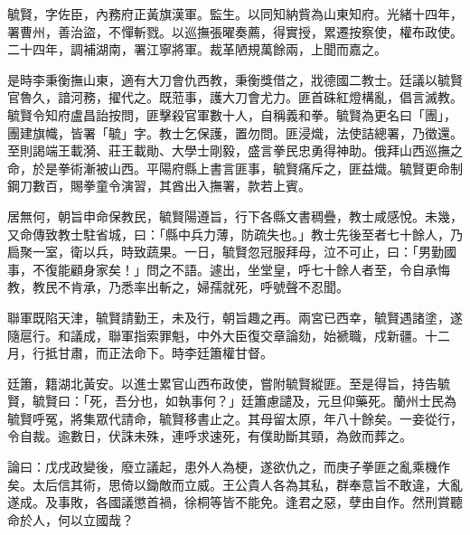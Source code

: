 \begin{pinyinscope}
毓賢，字佐臣，內務府正黃旗漢軍。監生。以同知納貲為山東知府。光緒十四年，署曹州，善治盜，不憚斬戮。以巡撫張曜奏薦，得實授，累遷按察使，權布政使。二十四年，調補湖南，署江寧將軍。裁革陋規萬餘兩，上聞而嘉之。

是時李秉衡撫山東，適有大刀會仇西教，秉衡獎借之，戕德國二教士。廷議以毓賢官魯久，諳河務，擢代之。既蒞事，護大刀會尤力。匪首硃紅燈構亂，倡言滅教。毓賢令知府盧昌詒按問，匪擊殺官軍數十人，自稱義和拳。毓賢為更名曰「團」，團建旗幟，皆署「毓」字。教士乞保護，置勿問。匪浸熾，法使詰總署，乃徵還。至則謁端王載漪、莊王載勛、大學士剛毅，盛言拳民忠勇得神助。俄拜山西巡撫之命，於是拳術漸被山西。平陽府縣上書言匪事，毓賢痛斥之，匪益熾。毓賢更命制鋼刀數百，賜拳童令演習，其酋出入撫署，款若上賓。

居無何，朝旨申命保教民，毓賢陽遵旨，行下各縣文書稠疊，教士咸感悅。未幾，又命傳致教士駐省城，曰：「縣中兵力薄，防疏失也。」教士先後至者七十餘人，乃扃聚一室，衛以兵，時致蔬果。一日，毓賢忽冠服拜母，泣不可止，曰：「男勤國事，不復能顧身家矣！」問之不語。遽出，坐堂皇，呼七十餘人者至，令自承悔教，教民不肯承，乃悉率出斬之，婦孺就死，呼號聲不忍聞。

聯軍既陷天津，毓賢請勤王，未及行，朝旨趣之再。兩宮已西幸，毓賢遇諸塗，遂隨扈行。和議成，聯軍指索罪魁，中外大臣復交章論劾，始褫職，戍新疆。十二月，行抵甘肅，而正法命下。時李廷簫權甘督。

廷簫，籍湖北黃安。以進士累官山西布政使，嘗附毓賢縱匪。至是得旨，持告毓賢，毓賢曰：「死，吾分也，如執事何？」廷簫慮譴及，元旦仰藥死。蘭州士民為毓賢呼冤，將集眾代請命，毓賢移書止之。其母留太原，年八十餘矣。一妾從行，令自裁。逾數日，伏誅未殊，連呼求速死，有僕助斷其頸，為斂而葬之。

論曰：戊戌政變後，廢立議起，患外人為梗，遂欲仇之，而庚子拳匪之亂乘機作矣。太后信其術，思倚以鋤敵而立威。王公貴人各為其私，群奉意旨不敢違，大亂遂成。及事敗，各國議懲首禍，徐桐等皆不能免。逢君之惡，孽由自作。然刑賞聽命於人，何以立國哉？


\end{pinyinscope}